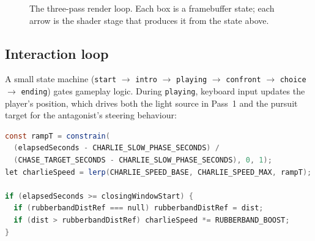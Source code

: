 \documentclass[conference]{IEEEtran}
\begin{document}
\begin{figure}[t]
\centering
{}
\caption{The three-pass render loop. Each box is a framebuffer state; each arrow is the shader stage that produces it from the state above.}
\label{fig:pipeline}
\end{figure}

\subsection{Interaction loop}
\label{sec:interaction}
A small state machine (\texttt{start} $\to$ \texttt{intro} $\to$ \texttt{playing} $\to$ \texttt{confront} $\to$ \texttt{choice} $\to$ \texttt{ending}) gates gameplay logic. During \texttt{playing}, keyboard input updates the player's position, which drives both the light source in Pass~1 and the pursuit target for the antagonist's steering behaviour:

\begin{lstlisting}[language=GLSL,caption={A three-stage speed model: a slow opening, a ramp toward a target duration, and a late rubber-band spike if the player is pulling away as time runs low.},label={lst:pursuit}]
const rampT = constrain(
  (elapsedSeconds - CHARLIE_SLOW_PHASE_SECONDS) /
  (CHASE_TARGET_SECONDS - CHARLIE_SLOW_PHASE_SECONDS), 0, 1);
let charlieSpeed = lerp(CHARLIE_SPEED_BASE, CHARLIE_SPEED_MAX, rampT);

if (elapsedSeconds >= closingWindowStart) {
  if (rubberbandDistRef === null) rubberbandDistRef = dist;
  if (dist > rubberbandDistRef) charlieSpeed *= RUBBERBAND_BOOST;
}
\end{lstlisting}
\end{document}
